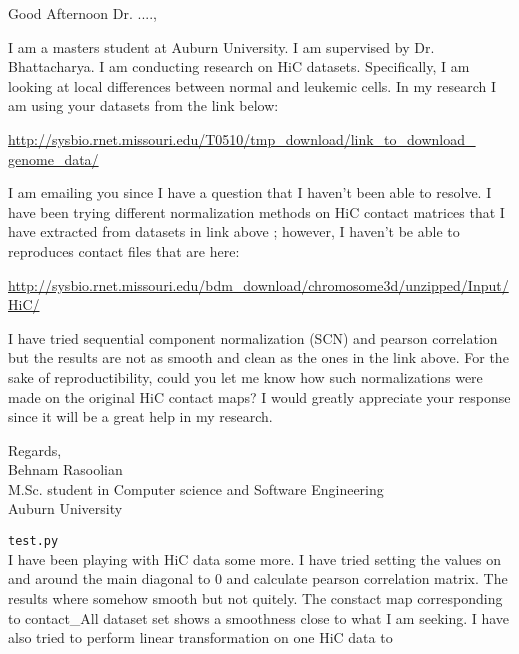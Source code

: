 \documentclass{article}
\begin{document}
\fontsize{11pt}{26pt}\selectfont

\setlength{\parindent}{0pt}
Good Afternoon Dr. ....,

I am a masters student at Auburn University. I am supervised by Dr. 
Bhattacharya. I am conducting research on HiC datasets. Specifically, 
I am looking at local differences between normal and leukemic cells.
In my research I am using your datasets from the link below:

\url{http://sysbio.rnet.missouri.edu/T0510/tmp_download/link_to_download_ genome_data/}

I am emailing you since I have a question that I haven't been 
able to resolve. I have been trying different normalization methods on HiC
contact matrices that I have extracted from datasets in link  above
; however, I haven't be able to reproduces contact files that
are here: 

\url{http://sysbio.rnet.missouri.edu/bdm_download/chromosome3d/unzipped/Input/HiC/}

I have tried sequential component normalization (SCN)
and pearson correlation but the results are not as smooth
and clean as the ones in the link above. For the sake of reproductibility,
could you let me know how such normalizations were made on the original
HiC contact maps? I would greatly appreciate your response since it will
be a great help in my research.

{\small
{}
Regards,\\
Behnam Rasoolian\\
M.Sc. student in Computer science and Software Engineering\\
Auburn University\\
}

\texttt{test.py} \\
I have been playing with HiC data some more. I have tried setting the 
values on and around the main diagonal to 0 and calculate pearson 
correlation matrix. The results where somehow smooth but not quitely.
The constact map corresponding to contact\_All dataset set shows
a smoothness close to what I am seeking.
I have also tried to perform linear transformation on one HiC data 
to 
\end{document}
